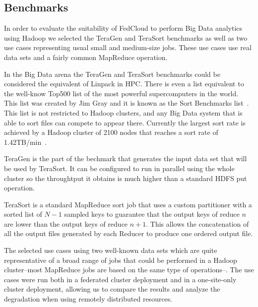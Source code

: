 

\subsection{Benchmarks}
\label{ssect-execution}

In order to evaluate the suitability of FedCloud to perform Big Data analytics using Hadoop we selected the TeraGen and TeraSort benchmarks as well as two use cases representing usual small and medium-size jobs. These use cases use real data sets and a fairly common MapReduce operation.

In the Big Data arena the TeraGen and TeraSort benchmarks could be considered the equivalent of Linpack in HPC. There is even a list equivalent to the well-know Top500 list of the most powerful supercomputers in the world. This list was created by Jim Gray and it is known as the Sort Benchmarks list~\cite{sortbenchmark}. This list is not restricted to Hadoop clusters, and any Big Data system that is able to sort files can compete to appear there. Currently the largest sort rate is achieved by a Hadoop cluster of 2100 nodes that reaches a sort rate of 1.42TB/min~\cite{sortbenchmarkyahoo}.

TeraGen is the part of the bechmark that generates the input data set that will be used by TeraSort. It can be configured to run in parallel using the whole cluster so the throughtput it obtains is much higher than a standard HDFS put operation.

TeraSort is a standard MapReduce sort job that uses a custom partitioner with a sorted list of $N-1$ sampled keys to guarantee that the output keys of reduce $n$ are lower than the output keys of reduce $n+1$. This allows the concatenation of all the output files generated by each Reducer to produce one ordered output file. 

The selected use cases using two well-known data sets which are quite representative of a broad range of jobs that could be performed in a Hadoop cluster--most MapReduce jobs are based on the same type of operations--. The use cases were run both in a federated cluster deployment and in a one-site-only cluster deployment, allowing us to compare the results and analyze the degradation when using remotely distributed resources.

